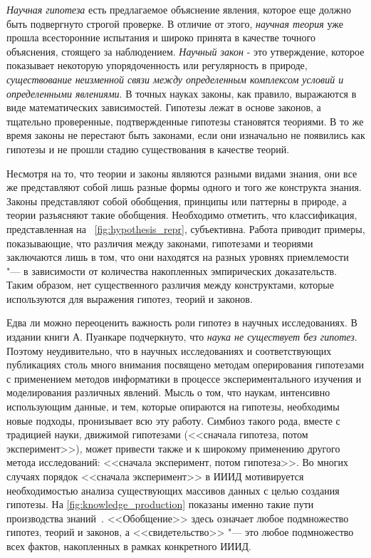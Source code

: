 \textit{Научная гипотеза} есть предлагаемое объяснение явления, которое еще должно быть подвергнуто строгой проверке. 
В отличие от этого, \textit{научная теория} уже прошла всесторонние испытания и широко принята в качестве точного 
объяснения, стоящего за наблюдением. \textit{Научный закон} - это утверждение, которое показывает некоторую 
упорядоченность или регулярность в природе, \textit{существование неизменной связи между определенным комплексом 
условий и определенными явлениями}. В точных науках законы, как правило, выражаются в виде математических зависимостей. 
Гипотезы лежат в основе законов, а тщательно проверенные, подтвержденные гипотезы становятся теориями. В то же время 
законы не перестают быть законами, если они изначально не появились как гипотезы и не прошли стадию существования 
в качестве теорий.

Несмотря на то, что теории и законы являются разными видами знания, они все же представляют собой лишь разные формы 
одного и того же конструкта знания. Законы представляют собой обобщения, принципы или паттерны в природе, а теории 
разъясняют такие обобщения. Необходимо отметить, что классификация, представленная на ~\cref{fig:hypothesis_repr}, 
субъективна. Работа \cite{Rao1998} приводит примеры, показывающие, что различия между законами, гипотезами и теориями 
заключаются лишь в том, что они находятся на разных уровнях приемлемости "--- в зависимости от количества накопленных 
эмпирических доказательств. Таким образом, нет существенного различия между конструктами, которые используются для 
выражения гипотез, теорий и законов. 

Едва ли можно переоценить важность роли гипотез в научных исследованиях. В издании книги А. Пуанкаре\cite{Poincare2015} 
подчеркнуто, что \textit{наука не существует без гипотез}. Поэтому неудивительно, что в научных исследованиях и 
соответствующих публикациях столь много внимания посвящено методам оперирования гипотезами с применением методов 
информатики в процессе экспериментального изучения и моделирования различных явлений. Мысль о том, что наукам, 
интенсивно использующим данные, и тем, которые опираются на гипотезы, необходимы новые подходы, пронизывает всю эту 
работу. Симбиоз такого рода, вместе с традицией науки, движимой гипотезами (<<сначала гипотеза, потом эксперимент>>), 
может привести также и к широкому применению другого метода исследований: <<сначала эксперимент, потом гипотеза>>. 
Во многих случаях порядок <<сначала эксперимент>> в ИИИД мотивируется необходимостью анализа существующих массивов 
данных с целью создания гипотезы. На \cref{fig:knowledge_production} показаны именно такие пути производства 
знаний~\cite{McComas2005}. <<Обобщение>> здесь означает любое подмножество гипотез, теорий и законов, 
а <<свидетельство>> "--- это любое подмножество всех фактов, накопленных в рамках конкретного ИИИД.

